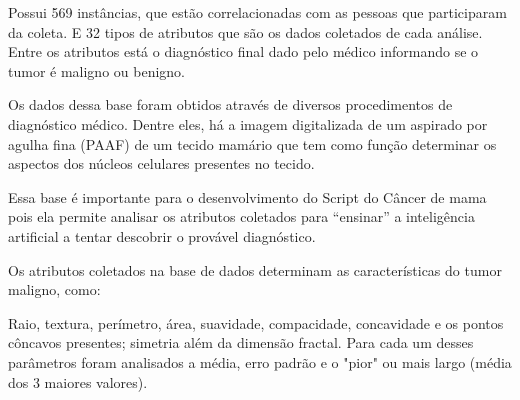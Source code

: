 Possui 569 instâncias, que estão correlacionadas com as pessoas que participaram da coleta. E 32 tipos de atributos que são os dados coletados de cada análise. Entre os atributos está o diagnóstico final dado pelo médico informando se o tumor é maligno ou benigno.

Os dados dessa base foram obtidos através de diversos procedimentos de diagnóstico médico. Dentre eles, há a imagem digitalizada de um aspirado por agulha fina (PAAF) de um tecido mamário que tem como função determinar os aspectos dos núcleos celulares presentes no tecido. 

Essa base é importante para o desenvolvimento do Script do Câncer de mama pois ela permite analisar os atributos coletados para “ensinar” a inteligência artificial a tentar descobrir o provável diagnóstico.

Os atributos coletados na base de dados determinam as características do tumor maligno, como:

Raio, textura, perímetro, área, suavidade, compacidade, concavidade e os pontos côncavos presentes; simetria além da dimensão fractal. Para cada um desses parâmetros foram analisados a média, erro padrão e o "pior" ou mais largo (média dos 3 maiores valores).


